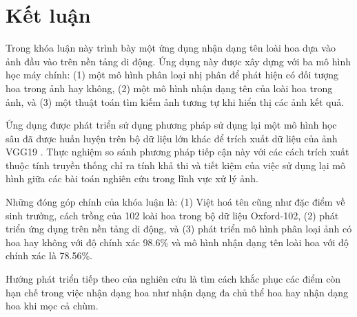 \documentclass[12pt]{report}
\begin{document}
																																																												
		\chapter{Kết luận}
		\label{chap:conclusion}
																																																												
		Trong khóa luận này trình bày một ứng dụng nhận dạng tên loài hoa dựa vào ảnh đầu vào trên nền tảng di động. Ứng dụng này được xây dựng với ba mô hình học máy chính: (1) một mô hình phân loại nhị phân để phát hiện có đối tượng hoa trong ảnh hay không, (2) một mô hình nhận dạng tên của loài hoa trong ảnh, và (3) một thuật toán tìm kiếm ảnh tương tự khi hiển thị các ảnh kết quả. 
																																																												
		Ứng dụng được phát triển sử dụng phương pháp sử dụng lại một mô hình học sâu đã được huấn luyện trên bộ dữ liệu lớn khác để trích xuất dữ liệu của ảnh VGG19 \cite{cia_vgg19}. Thực nghiệm so sánh phương pháp tiếp cận này với các cách trích xuất thuộc tính truyền thống chỉ ra tính khả thi và tiết kiệm của việc sử dụng lại mô hình giữa các bài toán nghiên cứu trong lĩnh vực xử lý ảnh.
																																																												
		Những đóng góp chính của khóa luận là: (1) Việt hoá tên cũng như đặc điểm về sinh trưởng, cách trồng của 102 loài hoa trong bộ dữ liệu Oxford-102, (2) phát triển ứng dụng trên nền tảng di động, và (3) phát triển mô hình phân loại ảnh có hoa hay không với độ chính xác 98.6\% và mô hình nhận dạng tên loài hoa với độ chính xác là 78.56\%.
																																																												
		Hướng phát triển tiếp theo của nghiên cứu là  tìm cách khắc phục các điểm còn hạn chế trong việc nhận dạng hoa như nhận dạng đa chủ thể hoa hay nhận dạng hoa khi mọc cả chùm.															
																																																																										
\end{document}
